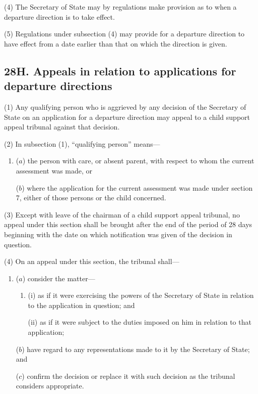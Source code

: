 \documentclass[12pt,a4paper]{article}
\begin{document}
(4) The Secretary of State may by regulations make provision as to when a departure direction is to take effect.

(5) Regulations under subsection (4) may provide for a departure direction to have effect from a date earlier than that on which the direction is given.


\subsection{28H. Appeals in relation to applications for departure directions}

(1) Any qualifying person who is aggrieved by any decision of the Secretary of State on an application for a departure direction may appeal to a child support appeal tribunal against that decision.

(2) In subsection (1), “qualifying person” means—
\begin{enumerate}\item[]
($a$) the person with care, or absent parent, with respect to whom the current assessment was made, or

($b$) where the application for the current assessment was made under section 7, either of those persons or the child concerned.
\end{enumerate}

(3) Except with leave of the chairman of a child support appeal tribunal, no appeal under this section shall be brought after the end of the period of 28 days beginning with the date on which notification was given of the decision in question.

(4) On an appeal under this section, the tribunal shall—
\begin{enumerate}\item[]
($a$) consider the matter—
\begin{enumerate}\item[]
(i) as if it were exercising the powers of the Secretary of State in relation to the application in question; and

(ii) as if it were subject to the duties imposed on him in relation to that application;
\end{enumerate}

($b$) have regard to any representations made to it by the Secretary of State; and

($c$) confirm the decision or replace it with such decision as the tribunal considers appropriate.
\end{enumerate}
\end{document}
